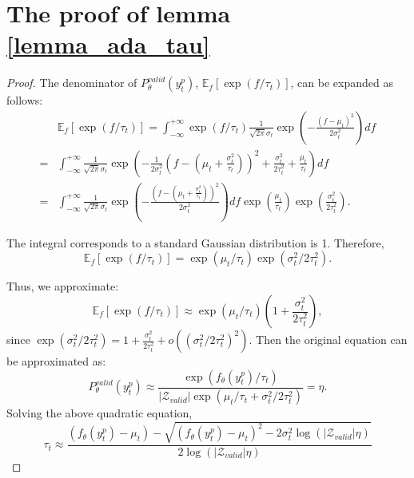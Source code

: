 \documentclass[sigconf,natbib=true]{acmart}
\begin{document}
\section{The proof of lemma \ref{lemma_ada_tau}}
\label{apd:lemma_adatau}
\begin{proof}
The denominator of \(P^{valid}_{\theta}(y_t^p)\), \(\mathbb{E}_f[\exp(f / \tau_t)]\), can be expanded as follows:
\begin{equation}
\begin{aligned}
&\mathbb{E}_f[\exp(f / \tau_t)]= \int_{-\infty}^{+\infty} \exp(f/\tau_t) \frac{1}{\sqrt{2\pi}\sigma_t} \exp\left(-\frac{(f-\mu_t)^2}{2\sigma_t^2}\right) df \\
=& \int_{-\infty}^{+\infty} \frac{1}{\sqrt{2\pi}\sigma_t} \exp\left(-\frac{1}{2\sigma_t^2} (f-(\mu_t+\frac{\sigma_t^2}{\tau_t}))^2 + \frac{\sigma_t^2}{2\tau_t^2} + \frac{\mu_t}{\tau_t}\right) df \\
=& \int_{-\infty}^{+\infty} \frac{1}{\sqrt{2\pi}\sigma_t} \exp\left(-\frac{(f-(\mu_t+\frac{\sigma_t^2}{\tau_t}))^2}{2\sigma_t^2}\right) df \exp(\frac{\mu_t}{\tau_t}) \exp(\frac{\sigma_t^2}{2\tau_t^2}).
\end{aligned}
\end{equation}

The integral corresponds to a standard Gaussian distribution is 1. Therefore,
\begin{equation}
\mathbb{E}_f[\exp(f / \tau_t)] = \exp(\mu_t / \tau_t) \exp(\sigma_t^2/2\tau_t^2).
\end{equation}

Thus, we approximate:
\begin{equation}
\mathbb{E}_f[\exp(f / \tau_t)] \approx \exp(\mu_t / \tau_t) \left(1 + \frac{\sigma_t^2}{2 \tau_t^2}\right),
\end{equation}
since \(\exp(\sigma_t^2 / 2 \tau_t^2) = 1 + \frac{\sigma_t^2}{2 \tau_t^2} + o((\sigma_t^2 / 2 \tau_t^2)^2)\). Then the original equation can be approximated as:
\begin{equation}
P^{valid}_{\theta}(y_t^p) \approx \frac{\exp(f_\theta(y_t^p) / \tau_t)}{|\mathcal{Z}_{valid}| \exp(\mu_t / \tau_t + \sigma_t^2 / 2 \tau_t^2)} = \eta.
\end{equation}
Solving the above quadratic equation, 
\begin{equation}
\tau_t \approx \frac{(f_\theta(y_t^p) - \mu_t) - \sqrt{(f_\theta(y_t^p) - \mu_t)^2 - 2 \sigma_t^2 \log(|\mathcal{Z}_{valid}| \eta)}}{2 \log(|\mathcal{Z}_{valid}| \eta)}
\end{equation}
\end{proof}
\end{document}
